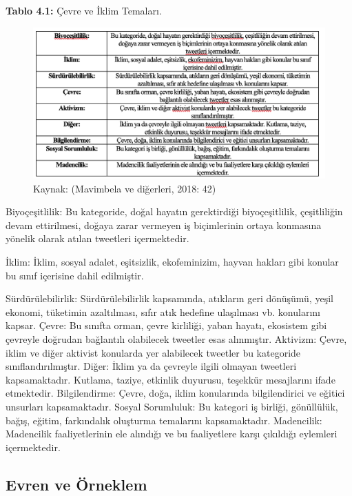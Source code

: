 \documentclass[
]{book}
\begin{document}
\textbf{Tablo 4.1:} Çevre ve İklim Temaları.

\begin{figure}
\includegraphics[width=0.95\linewidth,height=0.95\textheight]{tablolar-sekiller/tablo-4-1} \caption{Kaynak: (Mavimbela ve diğerleri, 2018: 42)}\label{fig:unnamed-chunk-3}
\end{figure}

Biyoçeşitlilik: Bu kategoride, doğal hayatın gerektirdiği biyoçeşitlilik, çeşitliliğin devam ettirilmesi, doğaya zarar vermeyen iş biçimlerinin ortaya konmasına yönelik olarak atılan tweetleri içermektedir.

İklim: İklim, sosyal adalet, eşitsizlik, ekofeminizim, hayvan hakları gibi konular bu sınıf içerisine dahil edilmiştir.

Sürdürülebilirlik:
Sürdürülebilirlik kapsamında, atıkların geri dönüşümü, yeşil ekonomi, tüketimin azaltılması, sıfır atık hedefine ulaşılması vb. konularını kapsar.
Çevre: Bu sınıfta orman, çevre kirliliği, yaban hayatı, ekosistem gibi çevreyle doğrudan bağlantılı olabilecek tweetler esas alınmıştır.
Aktivizm: Çevre, iklim ve diğer aktivist konularda yer alabilecek tweetler bu kategoride sınıflandırılmıştır.
Diğer: İklim ya da çevreyle ilgili olmayan tweetleri kapsamaktadır. Kutlama, taziye, etkinlik duyurusu, teşekkür mesajlarını ifade etmektedir.
Bilgilendirme: Çevre, doğa, iklim konularında bilgilendirici ve eğitici unsurları kapsamaktadır.
Sosyal Sorumluluk: Bu kategori iş birliği, gönüllülük, bağış, eğitim, farkındalık oluşturma temalarını kapsamaktadır.
Madencilik: Madencilik faaliyetlerinin ele alındığı ve bu faaliyetlere karşı çıkıldığı eylemleri içermektedir.

\hypertarget{evren-ve-uxf6rneklem}{%
\subsection{Evren ve Örneklem}\label{evren-ve-uxf6rneklem}}
\end{document}
